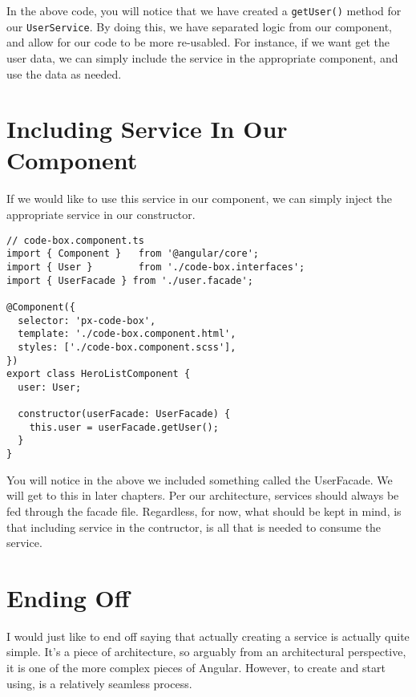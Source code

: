 In the above code, you will notice that we have created a \lstinline{getUser()}
method for our \lstinline{UserService}. By doing this, we have separated logic 
from our component, and allow for our code to be more re-usabled. For instance, 
if we want get the user data, we can simply include the service in the 
appropriate component, and use the data as needed. 

\section{Including Service In Our Component}
If we would like to use this service in our component, we can simply inject 
the appropriate service in our constructor. 

\begin{lstlisting}
// code-box.component.ts
import { Component }   from '@angular/core';
import { User }        from './code-box.interfaces';
import { UserFacade } from './user.facade';

@Component({
  selector: 'px-code-box',
  template: './code-box.component.html',
  styles: ['./code-box.component.scss'],
})
export class HeroListComponent {
  user: User;

  constructor(userFacade: UserFacade) {
    this.user = userFacade.getUser();
  }
}
\end{lstlisting}

You will notice in the above we included something called the UserFacade. We will 
get to this in later chapters. Per our architecture, services should always be 
fed through the facade file. Regardless, for now, what should be kept in mind, 
is that including service in the contructor, is all that is needed to consume 
the service. 

\section{Ending Off}
I would just like to end off saying that actually creating a service is 
actually quite simple. It's a piece of architecture, so arguably from an 
architectural perspective, it is one of the more complex pieces of Angular. 
However, to create and start using, is a relatively seamless process.
